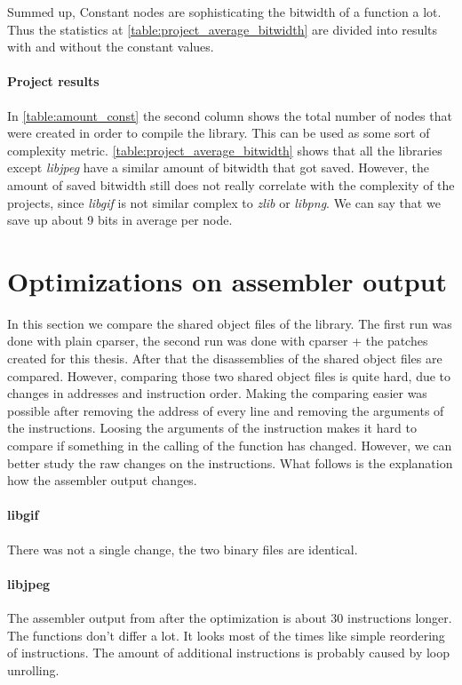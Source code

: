 Summed up, Constant nodes are sophisticating the bitwidth of a function a lot. Thus the statistics at \ref{table:project_average_bitwidth} are divided into results with and without the constant values.

\paragraph{Project results}

In \autoref{table:amount_const} the second column shows the total number of nodes that were created in order to compile the library. This can be used as some sort of complexity metric. 
\autoref{table:project_average_bitwidth} shows that all the libraries except \textit{libjpeg} have a similar amount of bitwidth that got saved. However, the amount of saved bitwidth still does not really correlate with the complexity of the projects, since \textit{libgif} is not similar complex to \textit{zlib} or \textit{libpng}.\newline
We can say that we save up about 9 bits in average per node.

\section{Optimizations on assembler output}

In this section we compare the shared object files of the library. The first run was done with plain cparser, the second run was done with cparser + the patches created for this thesis.\newline
After that the disassemblies of the shared object files are compared. However, comparing those two shared object files is quite hard, due to changes in addresses and instruction order. Making the comparing easier was possible after removing the address of every line and removing the arguments of the instructions. Loosing the arguments of the instruction makes it hard to compare if something in the calling of the function has changed. However, we can better study the raw changes on the instructions. What follows is the explanation how the assembler output changes.

\paragraph{libgif} There was not a single change, the two binary files are identical.
\paragraph{libjpeg} The assembler output from after the optimization is about 30 instructions longer. The functions don't differ a lot. It looks most of the times like simple reordering of instructions. The amount of additional instructions is probably caused by loop unrolling.

